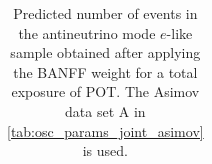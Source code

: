 \begin{table}
\begin{tabular} { | l ||r | r | r | r | r | r | | r | }
\end{tabular}
\caption{
Predicted number of events in the antineutrino mode $e$-like sample
obtained after applying the BANFF weight
for a total exposure of \TotalPotNuBarRunOneSevenC{} POT.
The Asimov data set A in \cref{tab:osc_params_joint_asimov} is used.
}
\label{tab:events_rhc1re_Asimov_A_Run17c}
\end{table}


